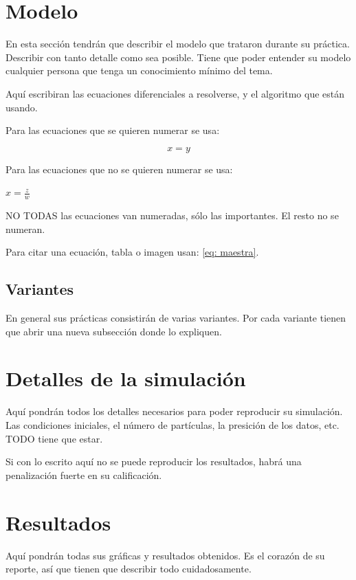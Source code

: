 \documentclass[pre,amsmath,amssymb, twocolumn, showpacs]{revtex4}
\begin{document}
  
\section{Modelo}
\label{model}

En esta sección tendrán que describir el modelo que trataron durante su práctica. Describir con tanto detalle como sea posible. Tiene que poder entender su modelo cualquier persona que tenga un conocimiento mínimo del tema. 

Aquí escribiran las ecuaciones diferenciales a resolverse, y el algoritmo que están usando. 

Para las ecuaciones que se quieren numerar se usa: 

\begin{equation}
\label{eq: maestra}
x = y
\end{equation}

Para las ecuaciones que no se quieren numerar se usa: 

$ x = \frac{z}{w} $

NO TODAS las ecuaciones van numeradas, sólo las importantes. El resto no se numeran. 

Para citar una ecuación, tabla o imagen usan: \ref{eq: maestra}.

\subsection{Variantes}

En general sus prácticas consistirán de varias variantes. Por cada variante tienen que abrir una nueva subsección donde lo expliquen. 

\section{Detalles de la simulación}

Aquí pondrán todos los detalles necesarios para poder reproducir su simulación. Las condiciones iniciales, el número de partículas, la presición de los datos, etc. TODO tiene que estar. 

Si con lo escrito aquí no se puede reproducir los resultados, habrá una penalización fuerte en su calificación. 

\section{Resultados}

Aquí pondrán todas sus gráficas y resultados obtenidos. Es el corazón de su reporte, así que tienen que describir todo cuidadosamente. 
\end{document}
